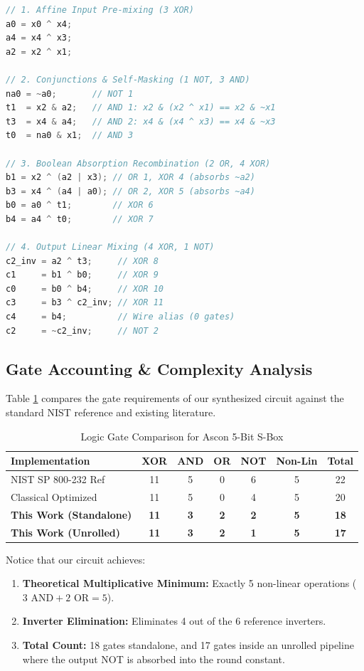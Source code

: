 \documentclass[journal,10pt]{IEEEtran}
\begin{document}
\begin{lstlisting}[language=Verilog, caption={Optimal 18-Gate Ascon Substitution Core.}, label={lst:sbox18}]
// 1. Affine Input Pre-mixing (3 XOR)
a0 = x0 ^ x4;
a4 = x4 ^ x3;
a2 = x2 ^ x1;

// 2. Conjunctions & Self-Masking (1 NOT, 3 AND)
na0 = ~a0;       // NOT 1
t1  = x2 & a2;   // AND 1: x2 & (x2 ^ x1) == x2 & ~x1
t3  = x4 & a4;   // AND 2: x4 & (x4 ^ x3) == x4 & ~x3
t0  = na0 & x1;  // AND 3

// 3. Boolean Absorption Recombination (2 OR, 4 XOR)
b1 = x2 ^ (a2 | x3); // OR 1, XOR 4 (absorbs ~a2)
b3 = x4 ^ (a4 | a0); // OR 2, XOR 5 (absorbs ~a4)
b0 = a0 ^ t1;        // XOR 6
b4 = a4 ^ t0;        // XOR 7

// 4. Output Linear Mixing (4 XOR, 1 NOT)
c2_inv = a2 ^ t3;     // XOR 8
c1     = b1 ^ b0;     // XOR 9
c0     = b0 ^ b4;     // XOR 10
c3     = b3 ^ c2_inv; // XOR 11
c4     = b4;          // Wire alias (0 gates)
c2     = ~c2_inv;     // NOT 2
\end{lstlisting}

\subsection{Gate Accounting & Complexity Analysis}
Table \ref{tab:gate_comparison} compares the gate requirements of our synthesized circuit against the standard NIST reference and existing literature.

\begin{table}[htbp]
\centering
\caption{Logic Gate Comparison for Ascon 5-Bit S-Box}
\label{tab:gate_comparison}
\begin{tabular}{lcccccc}
\toprule
\textbf{Implementation} & \textbf{XOR} & \textbf{AND} & \textbf{OR} & \textbf{NOT} & \textbf{Non-Lin} & \textbf{Total} \\
\midrule
NIST SP 800-232 Ref & 11 & 5 & 0 & 6 & 5 & 22 \\
Classical Optimized & 11 & 5 & 0 & 4 & 5 & 20 \\
\textbf{This Work (Standalone)} & \textbf{11} & \textbf{3} & \textbf{2} & \textbf{2} & \textbf{5} & \textbf{18} \\
\textbf{This Work (Unrolled)} & \textbf{11} & \textbf{3} & \textbf{2} & \textbf{1} & \textbf{5} & \textbf{17} \\
\bottomrule
\end{tabular}
\end{table}

Notice that our circuit achieves:
\begin{enumerate}
    \item \textbf{Theoretical Multiplicative Minimum:} Exactly 5 non-linear operations ($3 \text{ AND} + 2 \text{ OR} = 5$).
    \item \textbf{Inverter Elimination:} Eliminates 4 out of the 6 reference inverters.
    \item \textbf{Total Count:} 18 gates standalone, and 17 gates inside an unrolled pipeline where the output NOT is absorbed into the round constant.
\end{enumerate}
\end{document}
